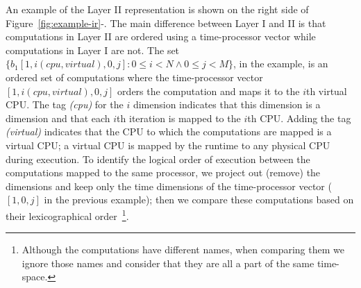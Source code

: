 An example of the Layer II representation is shown on the right side of Figure~\ref{fig:example-ir}-\codeone{}.
The main difference between Layer I and II is that computations in Layer II are ordered using a time-processor vector while computations in Layer I are not.  The set $\{b_1[1, i (cpu, virtual), 0, j]:  0\leq i < N \wedge 0\leq j < M\}$, in the example, is an ordered set of computations where the time-processor vector $[1, i (cpu, virtual), 0, j]$ orders the computation and maps it to the $i$th virtual CPU.  The tag \emph{(cpu)} for the $i$ dimension indicates that this dimension is a \processor dimension and that each $i$th iteration is mapped to the $i$th CPU. Adding the tag \emph{(virtual)} indicates that the CPU to which the computations are mapped is a virtual CPU; a virtual CPU is mapped by the runtime to any physical CPU during execution.  To identify the logical order of execution between the computations mapped to the same processor, we project out (remove) the \processor{} dimensions and keep only the time dimensions of the time-processor vector ($[1, 0, j]$ in the previous example); then we compare these computations based on their lexicographical order~\footnote{Although the computations have different names, when comparing them we ignore those names and consider that they are all a part of the same time-\processor{} space.}.





